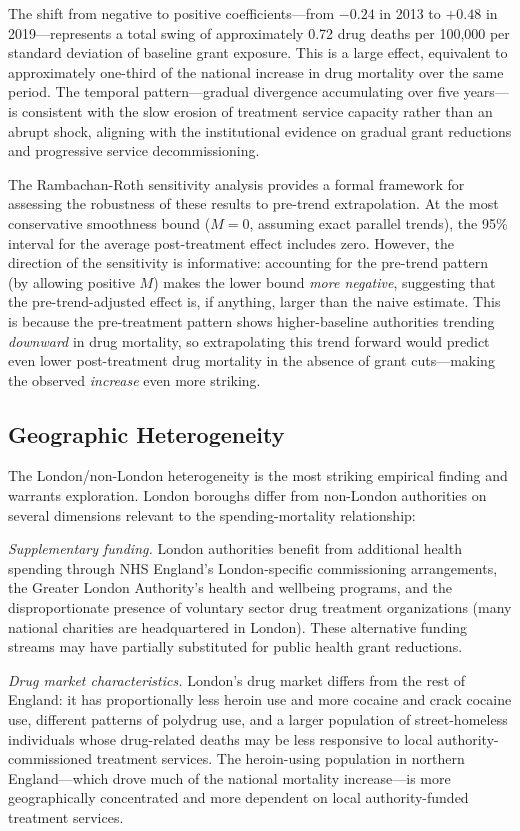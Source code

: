 \documentclass[12pt]{article}
\begin{document}
The shift from negative to positive coefficients---from $-0.24$ in 2013 to $+0.48$ in 2019---represents a total swing of approximately 0.72 drug deaths per 100,000 per standard deviation of baseline grant exposure. This is a large effect, equivalent to approximately one-third of the national increase in drug mortality over the same period. The temporal pattern---gradual divergence accumulating over five years---is consistent with the slow erosion of treatment service capacity rather than an abrupt shock, aligning with the institutional evidence on gradual grant reductions and progressive service decommissioning.

The Rambachan-Roth sensitivity analysis provides a formal framework for assessing the robustness of these results to pre-trend extrapolation. At the most conservative smoothness bound ($M = 0$, assuming exact parallel trends), the 95\% interval for the average post-treatment effect includes zero. However, the direction of the sensitivity is informative: accounting for the pre-trend pattern (by allowing positive $M$) makes the lower bound \textit{more negative}, suggesting that the pre-trend-adjusted effect is, if anything, larger than the naive estimate. This is because the pre-treatment pattern shows higher-baseline authorities trending \textit{downward} in drug mortality, so extrapolating this trend forward would predict even lower post-treatment drug mortality in the absence of grant cuts---making the observed \textit{increase} even more striking.

\subsection{Geographic Heterogeneity}

The London/non-London heterogeneity is the most striking empirical finding and warrants exploration. London boroughs differ from non-London authorities on several dimensions relevant to the spending-mortality relationship:

\textit{Supplementary funding.} London authorities benefit from additional health spending through NHS England's London-specific commissioning arrangements, the Greater London Authority's health and wellbeing programs, and the disproportionate presence of voluntary sector drug treatment organizations (many national charities are headquartered in London). These alternative funding streams may have partially substituted for public health grant reductions.

\textit{Drug market characteristics.} London's drug market differs from the rest of England: it has proportionally less heroin use and more cocaine and crack cocaine use, different patterns of polydrug use, and a larger population of street-homeless individuals whose drug-related deaths may be less responsive to local authority-commissioned treatment services. The heroin-using population in northern England---which drove much of the national mortality increase---is more geographically concentrated and more dependent on local authority-funded treatment services.
\end{document}
